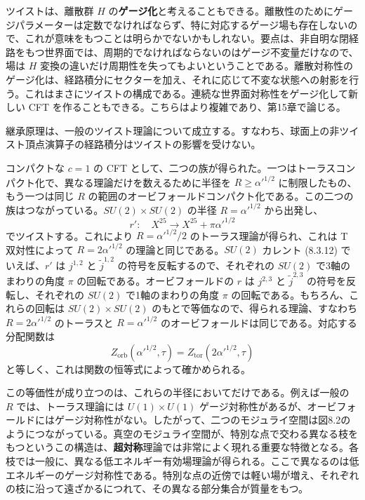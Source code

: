 ツイストは、離散群 $H$ の\textbf{ゲージ化}と考えることもできる。離散性のためにゲージパラメーターは定数でなければならず、特に対応するゲージ場も存在しないので、これが意味をもつことは明らかでないかもしれない。要点は、非自明な閉経路をもつ世界面では、周期的でなければならないのはゲージ不変量だけなので、場は $H$ 変換の違いだけ周期性を失ってもよいということである。離散対称性のゲージ化は、経路積分にセクターを加え、それに応じて不変な状態への射影を行う。これはまさにツイストの構成である。連続な世界面対称性をゲージ化して新しい CFT を作ることもできる。こちらはより複雑であり、第15章で論じる。

継承原理は、一般のツイスト理論について成立する。すなわち、球面上の非ツイスト頂点演算子の経路積分はツイストの影響を受けない。


コンパクトな $c=1$ の CFT として、二つの族が得られた。一つはトーラスコンパクト化で、異なる理論だけを数えるために半径を $R\geq\alpha'^{1/2}$ に制限したもの、もう一つは同じ $R$ の範囲のオービフォールドコンパクト化である。この二つの族はつながっている。$SU(2)\times SU(2)$ の半径 $R=\alpha'^{1/2}$ から出発し、
\begin{equation}
r':\quad X^{25}\longrightarrow X^{25}+\pi\alpha'^{1/2}
\tag{8.5.20}\label{eq:8.5.20}
\end{equation}
でツイストする。これにより $R=\alpha'^{1/2}/2$ のトーラス理論が得られ、これは T 双対性によって $R=2\alpha'^{1/2}$ の理論と同じである。$SU(2)$ カレント (8.3.12) でいえば、$r'$ は $j^{1,2}$ と $\widetilde j^{1,2}$ の符号を反転するので、それぞれの $SU(2)$ で3軸のまわりの角度 $\pi$ の回転である。オービフォールドの $r$ は $j^{2,3}$ と $\widetilde j^{2,3}$ の符号を反転し、それぞれの $SU(2)$ で1軸のまわりの角度 $\pi$ の回転である。もちろん、これらの回転は $SU(2)\times SU(2)$ のもとで等価なので、得られる理論、すなわち $R=2\alpha'^{1/2}$ のトーラスと $R=\alpha'^{1/2}$ のオービフォールドは同じである。対応する分配関数は
\begin{equation}
Z_{\mathrm{orb}}(\alpha'^{1/2},\tau)
=Z_{\mathrm{tor}}(2\alpha'^{1/2},\tau)
\tag{8.5.21}\label{eq:8.5.21}
\end{equation}
と等しく、これは関数の恒等式によって確かめられる。

この等価性が成り立つのは、これらの半径においてだけである。例えば一般の $R$ では、トーラス理論には $U(1)\times U(1)$ ゲージ対称性があるが、オービフォールドにはゲージ対称性がない。したがって、二つのモジュライ空間は図8.2のようにつながっている。真空のモジュライ空間が、特別な点で交わる異なる枝をもつというこの構造は、\textbf{超対称}理論では非常によく現れる重要な特徴となる。各枝では一般に、異なる低エネルギー有効場理論が得られる。ここで異なるのは低エネルギーのゲージ対称性である。特別な点の近傍では軽い場が増え、それぞれの枝に沿って遠ざかるにつれて、その異なる部分集合が質量をもつ。

